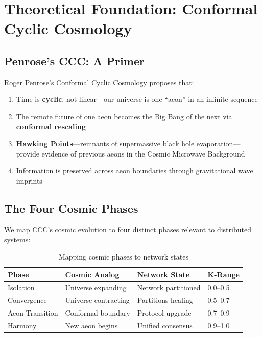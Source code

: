 \documentclass[12pt,a4paper]{article}
\begin{document}
\section{Theoretical Foundation: Conformal Cyclic Cosmology}

\subsection{Penrose's CCC: A Primer}

Roger Penrose's Conformal Cyclic Cosmology proposes that:
\begin{enumerate}
    \item Time is \textbf{cyclic}, not linear---our universe is one ``aeon'' in an infinite sequence
    \item The remote future of one aeon becomes the Big Bang of the next via \textbf{conformal rescaling}
    \item \textbf{Hawking Points}---remnants of supermassive black hole evaporation---provide
          evidence of previous aeons in the Cosmic Microwave Background
    \item Information is preserved across aeon boundaries through gravitational wave imprints
\end{enumerate}

\subsection{The Four Cosmic Phases}

We map CCC's cosmic evolution to four distinct phases relevant to distributed systems:

\begin{table}[H]
\centering
\begin{tabular}{llll}
\toprule
\textbf{Phase} & \textbf{Cosmic Analog} & \textbf{Network State} & \textbf{K-Range} \\
\midrule
Isolation & Universe expanding & Network partitioned & 0.0--0.5 \\
Convergence & Universe contracting & Partitions healing & 0.5--0.7 \\
Aeon Transition & Conformal boundary & Protocol upgrade & 0.7--0.9 \\
Harmony & New aeon begins & Unified consensus & 0.9--1.0 \\
\bottomrule
\end{tabular}
\caption{Mapping cosmic phases to network states}
\end{table}
\end{document}
